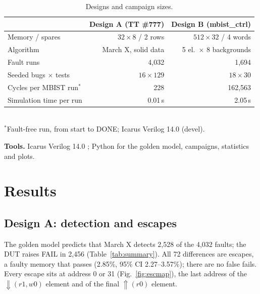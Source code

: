 \documentclass[conference]{IEEEtran}
\begin{document}
\begin{table}[t]
\centering
\caption{Designs and campaign sizes.}
\label{tab:setup}
\setlength{\tabcolsep}{3pt}
\begin{tabular}{@{}lrr@{}}
\toprule
 & Design A (TT \#777) & Design B (mbist\_ctrl) \\
\midrule
Memory / spares        & $32\times8$ / 2 rows & $512\times32$ / 4 words \\
Algorithm              & March X, solid data   & 5 el.\ $\times$ 8 backgrounds \\
Fault runs             & 4{,}032               & 1{,}694 \\
Seeded bugs $\times$ tests & $16\times129$     & $18\times30$ \\
Cycles per MBIST run$^\ast$ & 228            & 162{,}563 \\
Simulation time per run & 0.01\,s             & 2.05\,s \\
\bottomrule
\end{tabular}
\\[2pt]\footnotesize $^\ast$Fault-free run, from start to DONE; Icarus Verilog 14.0 (devel).
\end{table}

\textbf{Tools.} Icarus Verilog 14.0 \cite{icarus}; Python for the golden model, campaigns,
statistics and plots.

\section{Results}
\label{sec:results}
\subsection{Design A: detection and escapes}
\label{sec:resA}
The golden model predicts that March X detects 2{,}528 of the 4{,}032 faults; the DUT raises FAIL
in 2{,}456 (Table~\ref{tab:summary}). All 72 differences are escapes, a
faulty memory that passes (2.85\%, 95\% CI 2.27--3.57\%); there are no false fails. Every escape
sits at address 0 or 31 (Fig.~\ref{fig:escmap}), the last address of the $\Downarrow(r1,w0)$
element and of the final $\Uparrow(r0)$ element.
\end{document}
